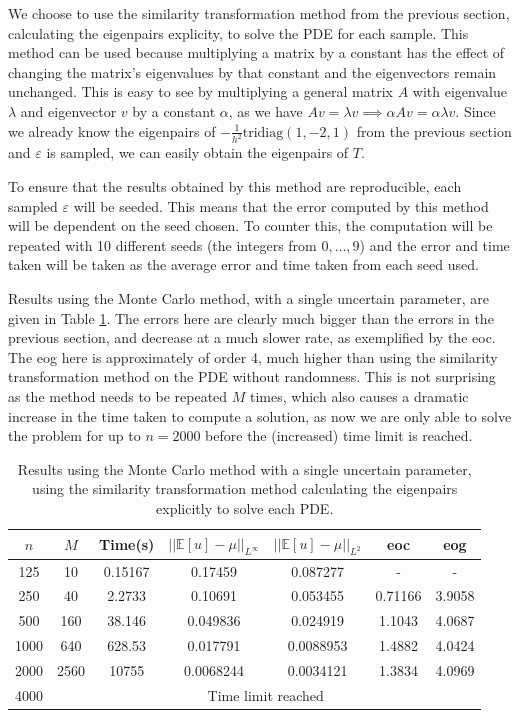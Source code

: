 \documentclass[11pt]{article}
\numberwithin{equation}{section}
\begin{document}
We choose to use the similarity transformation method from the previous section, calculating the eigenpairs explicity, to solve the PDE for each sample. This method can be used because multiplying a matrix by a constant has the effect of changing the matrix's eigenvalues by that constant and the eigenvectors remain unchanged. This is easy to see by multiplying a general matrix $A$ with eigenvalue $\lambda$ and eigenvector $v$ by a constant $\alpha$, as we have $Av = \lambda v \implies \alpha A v = \alpha \lambda v$. Since we already know the eigenpairs of $-\frac{1}{h^2} \text{tridiag}(1,-2,1)$ from the previous section and $\varepsilon$ is sampled, we can easily obtain the eigenpairs of $T$. 

To ensure that the results obtained by this method are reproducible, each sampled $\varepsilon$ will be seeded. This means that the error computed by this method will be dependent on the seed chosen. To counter this, the computation will be repeated with 10 different seeds (the integers from $0, \dots, 9$) and the error and time taken will be taken as the average error and time taken from each seed used.

Results using the Monte Carlo method, with a single uncertain parameter, are given in Table \ref{table:monte carlo}. The errors here are clearly much bigger than the errors in the previous section, and decrease at a much slower rate, as exemplified by the eoc. The eog here is approximately of order 4, much higher than using the similarity transformation method on the PDE without randomness. This is not surprising as the method needs to be repeated $M$ times, which also causes a dramatic increase in the time taken to compute a solution, as now we are only able to solve the problem for up to $n=2000$ before the (increased) time limit is reached.  
\begin{table}[H]
\centering
\begin{tabular}{|c|c|c|c|c|c|c|}
\hline
$n$ & $M$ & Time(s) & $|| \mathbb{E}[u] - \mu ||_{L^{\infty}}$ & $|| \mathbb{E}[u] - \mu ||_{L^{2}}$ & eoc & eog \\
\hline
125 & 10 & 0.15167 & 0.17459 & 0.087277 & - & - \\
250 & 40 & 2.2733 & 0.10691 & 0.053455 & 0.71166 & 3.9058 \\
500 & 160 & 38.146 & 0.049836 & 0.024919 & 1.1043 & 4.0687 \\
1000 & 640 & 628.53 & 0.017791 & 0.0088953 & 1.4882 & 4.0424 \\
2000 & 2560 & 10755 & 0.0068244 & 0.0034121 & 1.3834 & 4.0969 \\
\cline{2-7}
4000 & \multicolumn{6}{c|}{Time limit reached} \\
\hline
\end{tabular}
\captionsetup{justification=centering}
\caption{Results using the Monte Carlo method with a single uncertain parameter, using the similarity transformation method calculating the eigenpairs explicitly to solve each PDE.}
\label{table:monte carlo}
\end{table}
\end{document}
